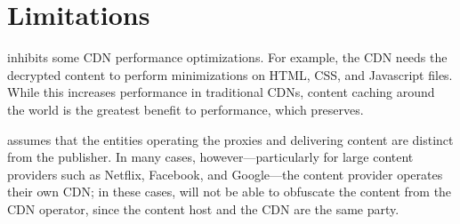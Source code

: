 \section{Limitations}
\label{sec:discussion}


\system{} inhibits some CDN performance optimizations.  For
example,
the CDN needs the 
decrypted content to perform minimizations on HTML, CSS, and Javascript files.  While 
this increases performance in traditional CDNs, content caching around the world is the greatest benefit to 
performance, which \system{} preserves.

\system{}
assumes that the entities operating the proxies and delivering content are
distinct from the publisher. In many cases, however---particularly
for large content providers such as Netflix, Facebook, and Google---the
content provider operates their own CDN; in these cases, \system{} will
not be able to obfuscate the content from the CDN operator, since the content host
and the CDN are the same party.  %

